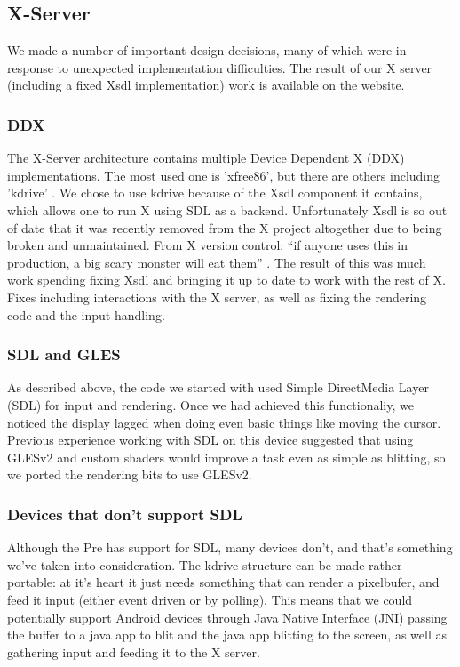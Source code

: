 \subsection{X-Server}

We made a number of important design decisions, many of which were in response to unexpected implementation difficulties.  The result of our X server (including a fixed Xsdl implementation) work is available on the website.
\subsubsection{DDX}
The X-Server architecture contains multiple Device Dependent X (DDX) implementations.  The most used one is 'xfree86', but there are others including 'kdrive' \cite{x_glossary}.  We chose to use kdrive because of the Xsdl component it contains, which allows one to run X using SDL as a backend.  Unfortunately Xsdl is so out of date that it was recently removed from the X project altogether due to being broken and unmaintained.
From X version control: ``if anyone uses this in production, a big scary monster will eat them'' \cite{x_quote}.  The result of this was much work spending fixing Xsdl and bringing it up to date to work with the rest of X.  Fixes including interactions with the X server, as well as fixing the rendering code and the input handling.
\subsubsection{SDL and GLES}
As described above, the code we started with used Simple DirectMedia Layer (SDL) \cite{sdl} for input and rendering.  Once we had achieved this functionaliy, we noticed the display lagged when doing even basic things like moving the cursor.  Previous experience working with SDL on this device suggested that using GLESv2 \cite{gles} and custom shaders would improve a task even as simple as blitting, so we ported the rendering bits to use GLESv2.

\subsubsection{Devices that don't support SDL}
Although the Pre has support for SDL, many devices don't, and that's something we've taken into consideration.  The kdrive structure can be made rather portable: at it's heart it just needs something that can render a pixelbufer, and feed it input (either event driven or by polling).  This means that we could potentially support Android devices through Java Native Interface (JNI) \cite{jni} passing the buffer to a java app to blit and the java app blitting to the screen, as well as gathering input and feeding it to the X server.
